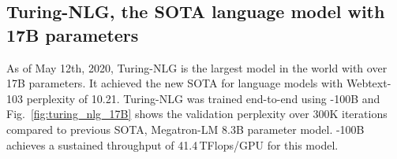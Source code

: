 \subsection{Turing-NLG, the SOTA language model with 17B parameters}
As of May 12th, 2020, Turing-NLG is the largest model in the world with over 17B parameters. It achieved the new SOTA for language models with Webtext-103 perplexity of 10.21. Turing-NLG was trained end-to-end using \name-100B and Fig.~\ref{fig:turing_nlg_17B} shows the validation perplexity over 300K iterations compared to previous SOTA, Megatron-LM 8.3B parameter model. \name-100B achieves a sustained throughput of 41.4\,TFlops/GPU for this model.

%

